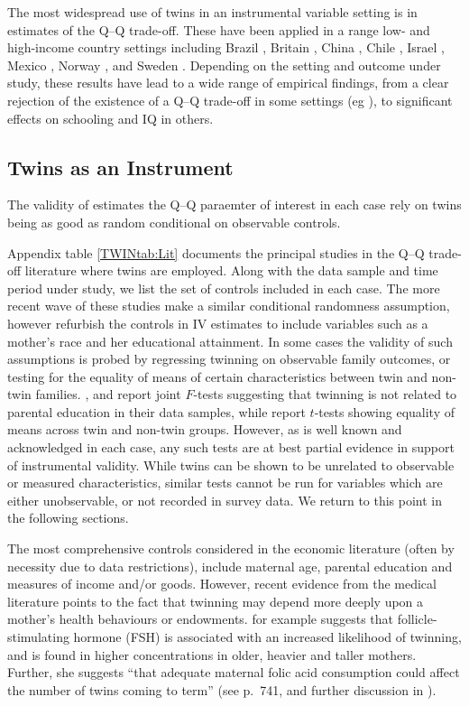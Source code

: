 \documentclass[subeqn]{article}
\begin{document}
\begin{spacing}{1.4}
The most widespread use of twins in an instrumental variable setting
is in estimates of the Q--Q trade-off.  These have been applied in a range low-
and high-income country settings including Brazil \citep{PonczekSouza2012},
Britain \citep{Grawe2008}, China \citep{Lietal2008}, Chile \citep{Sanhueza2009},
Israel \citep{Angristetal2010}, Mexico \citep{FitzsimonsMalde2010}, Norway
\citep{Blacketal2005,Blacketal2010,MogstadWiswall2016}, and Sweden
\citep{AslundGronqvist2010}. Depending on the setting and outcome under study,
these results have lead to a wide range of empirical findings, from a clear
rejection of the existence of a Q--Q trade-off in some settings (eg
\citet{Angristetal2010}), to significant effects on schooling and IQ in
others.


\subsection{Twins as an Instrument}
The validity of estimates the Q--Q paraemter of interest in each case rely on
twins being as good as random conditional on observable controls.

Appendix table \ref{TWINtab:Lit} documents the principal studies in the Q--Q trade-off 
literature where twins are employed.  Along with the data sample and time period 
under study, we list the set of controls included in each case.  The more recent
wave of these studies make a similar conditional randomness assumption, however
refurbish the controls in IV estimates to include variables such as a mother's 
race and her educational attainment.  In some cases the validity of such 
assumptions is probed by regressing twinning on observable family outcomes, or 
testing for the equality of means of certain characteristics between twin and
non-twin families. \citet{Blacketal2005}, \citet{Lietal2008} and 
\citet{Sanhueza2009} report joint $F$-tests suggesting that twinning is not 
related to parental education in their data samples, while 
\citet{RosenzweigZhang2009} report $t$-tests showing equality of means across 
twin and non-twin groups. However, as is well known and acknowledged in each 
case, any such tests are at best partial evidence in support of instrumental 
validity. While twins can be shown to be unrelated to observable or measured 
characteristics, similar tests cannot be run for variables which are either 
unobservable, or not recorded in survey data. We return to this point in the 
following sections.

The most comprehensive controls considered in the economic literature (often by
necessity due to data restrictions), include maternal age, parental education
and measures of income and/or goods.  However, recent evidence from the medical
literature points to the fact that twinning may depend more deeply upon a 
mother's health behaviours or endowments. \citet{Hall2003} for example suggests 
that follicle-stimulating hormone (FSH) is associated with an increased 
likelihood of twinning, and is found in higher concentrations in older, heavier 
and taller mothers. Further, she suggests ``that adequate maternal folic acid 
consumption could affect the number of twins coming to term'' (see p.\ 741, and 
further discussion in \citet{Lietal2003}).


\end{spacing}
\end{document}
